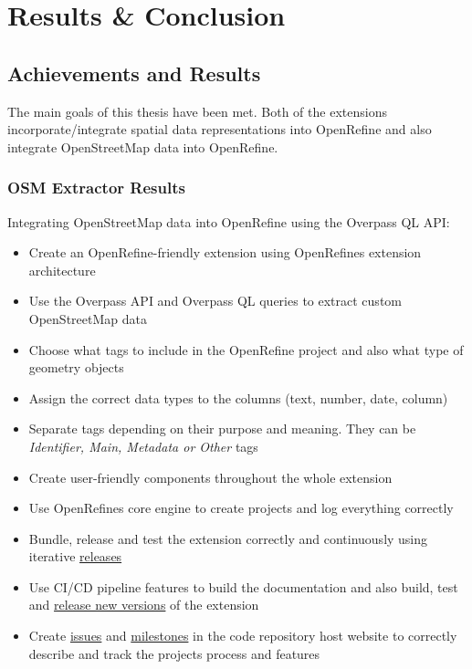 \chapter{Results \& Conclusion}\label{ch:results-&-conclusion}
\section{Achievements and Results}
The main goals of this thesis have been met. Both of the extensions incorporate/integrate spatial data representations into OpenRefine and also integrate OpenStreetMap data into OpenRefine.
\subsection{OSM Extractor Results}
Integrating OpenStreetMap data into OpenRefine using the Overpass QL API:
\begin{itemize}
    \item Create an OpenRefine-friendly extension using OpenRefine\textquotesingle s extension architecture
    \item Use the Overpass API and Overpass QL queries to extract custom OpenStreetMap data
    \item Choose what tags to include in the OpenRefine project and also what type of geometry objects
    \item Assign the correct data types to the columns (text, number, date, column)
    \item Separate tags depending on their purpose and meaning. They can be \textit{Identifier, Main, Metadata or Other} tags
    \item Create user-friendly components throughout the whole extension
    \item Use OpenRefine\textquotesingle s core engine to create projects and log everything correctly
    \item Bundle, release and test the extension correctly and continuously using iterative \href{https://gitlab.com/labiangashi/osm-extractor/-/releases}{releases}
    \item Use CI/CD pipeline features to build the documentation and also build, test and \href{https://gitlab.com/labiangashi/osm-extractor/-/releases}{release new versions} of the extension
    \item Create \href{https://gitlab.com/labiangashi/osm-extractor/-/issues}{issues} and
    \href{https://gitlab.com/labiangashi/osm-extractor/-/milestones}{milestones} in the code repository host website to correctly describe and
    track the project\textquotesingle s process and features
\end{itemize}
